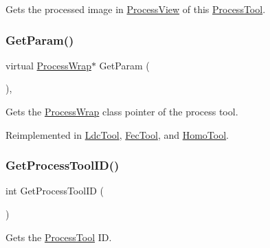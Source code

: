 Gets the processed image in \mbox{\hyperlink{class_process_view}{Process\+View}} of this \mbox{\hyperlink{class_process_tool}{Process\+Tool}}. \mbox{\label{class_process_tool_a355ebcf991f86f59f4241ea4345547fc}} 
\subsubsection{\texorpdfstring{Get\+Param()}{GetParam()}}
{\footnotesize\ttfamily virtual \mbox{\hyperlink{class_process_wrap}{Process\+Wrap}}$\ast$ Get\+Param (\begin{DoxyParamCaption}{ }\end{DoxyParamCaption})\hspace{0.3cm}{\ttfamily [inline]}, {\ttfamily [virtual]}}

Gets the \mbox{\hyperlink{class_process_wrap}{Process\+Wrap}} class pointer of the process tool. 

Reimplemented in \mbox{\hyperlink{class_ldc_tool_af9828a2daf501b328a07dd8fa3d6abeb}{Ldc\+Tool}}, \mbox{\hyperlink{class_fec_tool_acccda5a312354ec0dcd215de8ed7ac03}{Fec\+Tool}}, and \mbox{\hyperlink{class_homo_tool_a497eb4f1812d3f38ea6657c35d64bf31}{Homo\+Tool}}.

\mbox{\label{class_process_tool_ab0e7d3a46484506a517325b938d537a0}} 
\subsubsection{\texorpdfstring{Get\+Process\+Tool\+I\+D()}{GetProcessToolID()}}
{\footnotesize\ttfamily int Get\+Process\+Tool\+ID (\begin{DoxyParamCaption}{ }\end{DoxyParamCaption})\hspace{0.3cm}{\ttfamily [inline]}}

Gets the \mbox{\hyperlink{class_process_tool}{Process\+Tool}} ID. \mbox{\label{class_process_tool_a06656026e81c2da884f1130804aac780}} 
